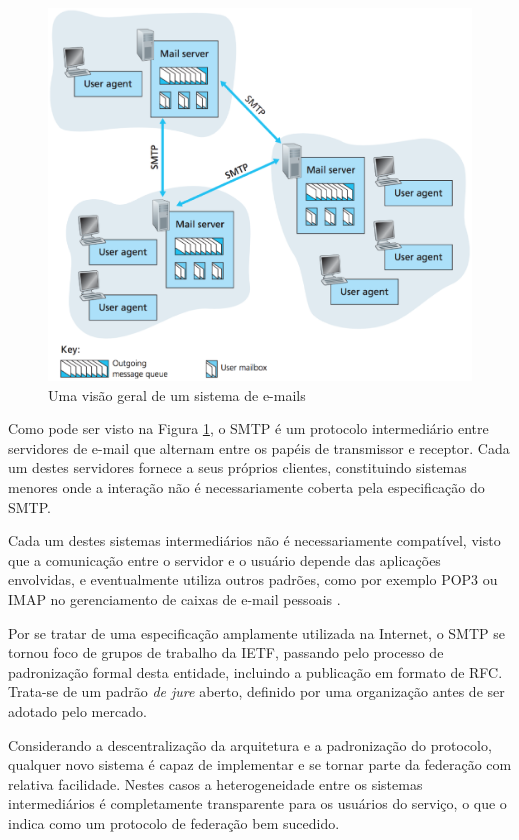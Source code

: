 \begin{figure}[h]
	\centering
		\includegraphics[keepaspectratio=true,scale=0.6]{figuras/smtp_internet.eps}
	\caption{Uma visão geral de um sistema de e-mails \cite{kurose2012}}
	\label{fig:smtpInternet}
\end{figure}

Como pode ser visto na Figura \ref{fig:smtpInternet}, o SMTP é um protocolo
intermediário entre servidores de e-mail que alternam entre os papéis de transmissor
e receptor. Cada um destes servidores fornece a seus próprios clientes, constituindo
sistemas menores onde a interação não é necessariamente coberta pela especificação
do SMTP.

Cada um destes sistemas intermediários não é necessariamente compatível, visto que a
comunicação entre o servidor e o usuário depende das aplicações envolvidas, e
eventualmente utiliza outros padrões, como por exemplo POP3 ou IMAP no gerenciamento
de caixas de e-mail pessoais \cite{tanenbaum2010}.

Por se tratar de uma especificação amplamente utilizada na Internet, o SMTP se
tornou foco de grupos de trabalho da IETF, passando pelo processo de padronização
formal desta entidade, incluindo a publicação em formato de RFC. Trata-se de um
padrão \textit{de jure} aberto, definido por uma organização antes de ser adotado
pelo mercado.

Considerando a descentralização da arquitetura e a padronização do protocolo,
qualquer novo sistema é capaz de implementar e se tornar parte da federação com
relativa facilidade. Nestes casos a heterogeneidade entre os sistemas intermediários
é completamente transparente para os usuários do serviço, o que o indica como um
protocolo de federação bem sucedido.



